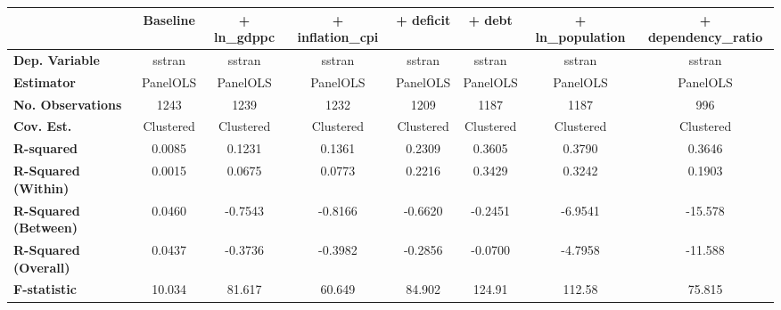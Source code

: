 \begin{center}
\begin{tabular}{lccccccc}
\toprule
                                   & \textbf{Baseline} & \textbf{+ ln\_gdppc} & \textbf{+ inflation\_cpi} & \textbf{+ deficit} & \textbf{+ debt} & \textbf{+ ln\_population} & \textbf{+ dependency\_ratio}  \\
\midrule
\textbf{Dep. Variable}             &       sstran      &        sstran        &           sstran          &       sstran       &      sstran     &           sstran          &            sstran             \\
\textbf{Estimator}                 &      PanelOLS     &       PanelOLS       &          PanelOLS         &      PanelOLS      &     PanelOLS    &          PanelOLS         &           PanelOLS            \\
\textbf{No. Observations}          &        1243       &         1239         &            1232           &        1209        &       1187      &            1187           &             996               \\
\textbf{Cov. Est.}                 &     Clustered     &      Clustered       &         Clustered         &     Clustered      &    Clustered    &         Clustered         &          Clustered            \\
\textbf{R-squared}                 &       0.0085      &        0.1231        &           0.1361          &       0.2309       &      0.3605     &           0.3790          &            0.3646             \\
\textbf{R-Squared (Within)}        &       0.0015      &        0.0675        &           0.0773          &       0.2216       &      0.3429     &           0.3242          &            0.1903             \\
\textbf{R-Squared (Between)}       &       0.0460      &       -0.7543        &          -0.8166          &      -0.6620       &     -0.2451     &          -6.9541          &           -15.578             \\
\textbf{R-Squared (Overall)}       &       0.0437      &       -0.3736        &          -0.3982          &      -0.2856       &     -0.0700     &          -4.7958          &           -11.588             \\
\textbf{F-statistic}               &       10.034      &        81.617        &           60.649          &       84.902       &      124.91     &           112.58          &            75.815             \\

\end{tabular}
\end{center}
